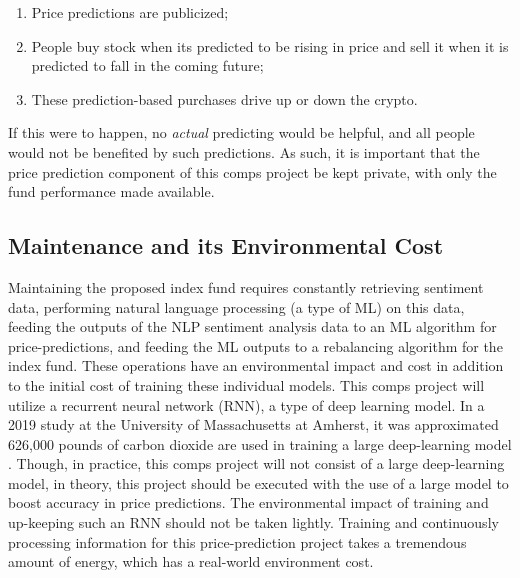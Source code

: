 \documentclass[10pt,twocolumn]{article}
\begin{document}
\begin{enumerate}
    \item Price predictions are publicized;
    \item People buy stock when its predicted to be rising in price and sell it when it is predicted to fall in the coming future;
    \item These prediction-based purchases drive up or down the crypto.
\end{enumerate}

If this were to happen, no \textit{actual} predicting would be helpful, and all people would not be benefited by such predictions. As such, it is important that the price prediction component of this comps project be kept private, with only the fund performance made available.

\subsection{Maintenance and its Environmental Cost}

Maintaining the proposed index fund requires constantly retrieving sentiment data, performing natural language processing (a type of ML) on this data, feeding the outputs of the NLP sentiment analysis data to an ML algorithm for price-predictions, and feeding the ML outputs to a rebalancing algorithm for the index fund. These operations have an environmental impact and cost in addition to the initial cost of training these individual models. This comps project will utilize a recurrent neural network (RNN), a type of deep learning model. In a 2019 study at the University of Massachusetts at Amherst, it was approximated 626,000 pounds of carbon dioxide are used in training a large deep-learning model \cite{ShrinkingDLCarbonFootprint}. Though, in practice, this comps project will not consist of a large deep-learning model, in theory, this project should be executed with the use of a large model to boost accuracy in price predictions. The environmental impact of training and up-keeping such an RNN should not be taken lightly. Training and continuously processing information for this price-prediction project takes a tremendous amount of energy, which has a real-world environment cost.
\end{document}
